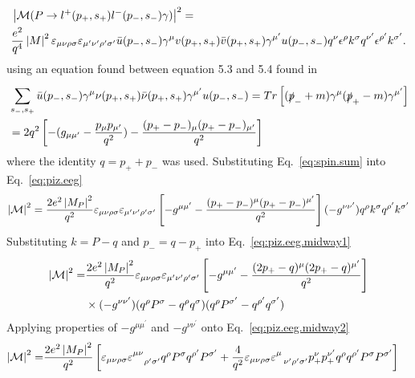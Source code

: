 \begin{align}\label{eq:piz.eeg}
& \left|{\cal M}(P\to l^+(p_+,s_+)l^-(p_-,s_-) \gamma)\right|^2 = \nonumber \\ & \frac{e^2}{q^4} \left|M\right|^2  \varepsilon_{\mu\nu\rho\sigma}\varepsilon_{\mu^{\prime}\nu^{\prime}\rho^{\prime}\sigma^{\prime}}\bar u(p_-,s_-) \gamma^\mu v(p_+,s_+) \bar v(p_+,s_+) \gamma^{\mu^{\prime}}  u(p_-,s_-) q^\nu \epsilon^\rho k^\sigma q^{\nu^{\prime}} \epsilon^{\rho^{\prime}} k^{\sigma^{\prime}} .
%
\end{align}
using an equation found between equation 5.3 and 5.4 found in~\cite{peskin}
\begin{align}\label{eq:spin.sum}
& \sum\limits_{s_{-},s_{+}}^{} \bar{u}(p_{-},s_{-})\gamma^{\mu}\nu(p_{+},s_{+})\bar{\nu}(p_{+},s_{+})\gamma^{\mu^{\prime}}u(p_{-},s_{-}) = Tr\left[ (\slashed{p}_- +m)\gamma^{\mu} (\slashed{p}_+-m)\gamma^{\mu^{\prime}} \right]\nonumber \\ & =2q^{2}\left[-(g_{\mu\mu^{\prime}}-\frac{p_{\mu}p_{\mu^{\prime}}}{q^{2}} ) - \frac{(p_{+} - p_{-})_{\mu}(p_{+} - p_{-})_{\mu^{\prime}}}{q^{2}}\right]
\end{align}
where the identity $q = p_+ + p_-$ was used.
Substituting Eq.~\ref{eq:spin.sum} into Eq.~\ref{eq:piz.eeg}
\begin{align} \label{eq:piz.eeg.midway1}
\left|{\cal M}\right|^{2} =\frac{2e^{2}\left|M_{P}\right|^{2}}{q^{2}}\varepsilon_{\mu\nu\rho\sigma}\varepsilon_{\mu^{\prime}\nu^{\prime}\rho^{\prime}\sigma^{\prime}}\left[-g^{\mu\mu^{\prime}} - \frac{(p_{+} - p_{-})^{\mu}(p_{+} - p_{-})^{\mu^{\prime}}}{q^{2}}\right](-g^{\nu\nu^{\prime}})q^{\rho}k^{\sigma}q^{\rho^{\prime}}k^{\sigma^{\prime}}
\end{align}
Substituting $k = P - q$ and $p_- = q - p_+$ into Eq.~\ref{eq:piz.eeg.midway1}
\begin{align} \label{eq:piz.eeg.midway2}
\left|{\cal M}\right|^{2} = & \frac{2e^{2}\left|M_{P}\right|^{2}}{q^{2}}\varepsilon_{\mu\nu\rho\sigma}\varepsilon_{\mu^{\prime}\nu^{\prime}\rho^{\prime}\sigma^{\prime}}\left[-g^{\mu\mu^{\prime}} - \frac{(2p_{+} - q)^{\mu}(2p_{+} - q)^{\mu^{\prime}}}{q^{2}}\right] \nonumber \\ & \times (-g^{\nu\nu^{\prime}})      
(q^{\rho}P^{\sigma} - q^{\rho}q^{\sigma}) (q^{\rho}P^{\sigma^{\prime}} - q^{\rho^{\prime}}q^{\sigma^{\prime}})
\end{align}
Applying properties of $-g^{\mu\mu^{\prime}}$ and $-g^{\nu\nu^{\prime}}$ onto Eq.~\ref{eq:piz.eeg.midway2}
\begin{align} \label{eq:piz.eeg.midway3}
\left|{\cal M}\right|^{2} = & \frac{2e^{2}\left|M_{P}\right|^{2}}{q^{2}}
\left[\varepsilon_{\mu\nu\rho\sigma}\varepsilon^{\mu\nu}_{\quad \rho^{\prime}\sigma^{\prime}}q^{\rho}P^{\sigma}q^{\rho^{\prime}}P^{\sigma^{\prime}} + \frac{4}{q^2} \varepsilon_{\mu\nu\rho\sigma}\varepsilon^{\mu}_{\ \ \nu^{\prime} \rho^{\prime}\sigma^{\prime}} p_{+}^{\nu}p_{+}^{\nu^{\prime}}q^{\rho}q^{\rho^{\prime}}P^{\sigma}P^{\sigma^{\prime}}\right]
\end{align}
